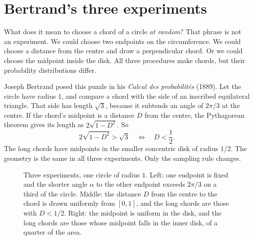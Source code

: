 \section{Bertrand's three experiments}

What does it mean to choose a chord of a circle \emph{at random}? That phrase is not an experiment. We could choose two endpoints on the circumference. We could choose a distance from the centre and draw a perpendicular chord. Or we could choose the midpoint inside the disk. All three procedures make chords, but their probability distributions differ.

Joseph Bertrand posed this puzzle in his \emph{Calcul des probabilit\'es} (1889). Let the circle have radius $1$, and compare a chord with the side of an inscribed equilateral triangle. That side has length $\sqrt3$, because it subtends an angle of $2\pi/3$ at the centre. If the chord's midpoint is a distance $D$ from the centre, the Pythagorean theorem gives its length as $2\sqrt{1-D^2}$. So
\[
 2\sqrt{1-D^2}>\sqrt3
 \quad\Longleftrightarrow\quad
 D<\frac12.
\]
The long chords have midpoints in the smaller concentric disk of radius $1/2$. The geometry is the same in all three experiments. Only the sampling rule changes.

\begin{figure}[ht]
\centering
{}
\caption{Three experiments, one circle of radius $1$. Left: one endpoint is fixed and the shorter angle $\alpha$ to the other endpoint exceeds $2\pi/3$ on a third of the circle. Middle: the distance $D$ from the centre to the chord is drawn uniformly from $[0,1]$, and the long chords are those with $D<1/2$. Right: the midpoint is uniform in the disk, and the long chords are those whose midpoint falls in the inner disk, of a quarter of the area.}
\label{fig:bertrand}
\end{figure}

